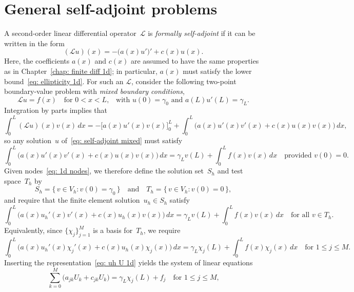 \section{General self-adjoint problems}
A second-order linear differential operator~$\mathcal{L}$ is 
\emph{formally self-adjoint} if it can be written in the form
\begin{equation}\label{eq: L self-adjoint}
(\mathcal{L}u)(x)=-\bigl(a(x)u'\bigr)'+c(x)u(x).
\end{equation}
Here, the coefficients $a(x)$ and $c(x)$ are assumed to have the same 
properties as in Chapter~\ref{chap: finite diff 1d}; in particular, $a(x)$ must 
satisfy the lower bound~\eqref{eq: ellipticity 1d}. For such an $\mathcal{L}$, 
consider the following two-point boundary-value problem with \emph{mixed 
boundary conditions},
\begin{equation}\label{eq: self-adjoint mixed}
\mathcal{L}u=f(x)\quad\text{for $0<x<L$,}\quad
\text{with $u(0)=\gamma_0$ and $a(L)u'(L)=\gamma_L$.}
\end{equation}
Integration by parts implies that
\begin{equation}\label{eq: Lu v by parts}
\int_0^L(\mathcal{L}u)(x)v(x)\,dx
    =-\bigl[a(x)u'(x)v(x)\bigr]_0^L+\int_0^L\bigl(a(x)u'(x)v'(x)+c(x)u(x)v(x)
        \bigr)\,dx,
\end{equation}
so any solution~$u$ of~\eqref{eq: self-adjoint mixed} must satisfy
\begin{equation}\label{eq: Lu=f weak 1d}
\int_0^L\bigl(a(x)u'(x)v'(x)+c(x)u(x)v(x)\bigr)\,dx
    =\gamma_Lv(L)+\int_0^Lf(x)v(x)\,dx
    \quad\text{provided $v(0)=0$.}
\end{equation}
Given nodes~\eqref{eq: 1d nodes}, we therefore define the solution set~$S_h$ and 
test space~$T_h$ by
\[
S_h=\{\,v\in V_h:v(0)=\gamma_0\,\}
\quad\text{and}\quad
T_h=\{\,v\in V_h:v(0)=0\,\},
\]
and require that the finite element solution~$u_h\in S_h$ satisfy
\begin{equation}\label{eq: self-adjoint mixed bc FEM}
\int_0^L\bigl(a(x)u_h'(x)v'(x)+c(x)u_h(x)v(x)\bigr)\,dx
    =\gamma_Lv(L)+\int_0^Lf(x)v(x)\,dx
    \quad\text{for all $v\in T_h$.}
\end{equation}
Equivalently, since $\{\chi_j\}_{j=1}^M$ is a basis for~$T_h$, we require
\[
\int_0^L\bigl(a(x)u_h'(x)\chi_j'(x)+c(x)u_h(x)\chi_j(x)\bigr)\,dx
    =\gamma_L\chi_j(L)+\int_0^Lf(x)\chi_j(x)\,dx
    \quad\text{for $1\le j\le M$.}
\]
Inserting the representation~\eqref{eq: uh U 1d} yields the system of linear 
equations
\[
\sum_{k=0}^M\bigl(a_{jk}U_k+c_{jk}U_k\bigr)=\gamma_L\chi_j(L)+f_j
    \quad\text{for $1\le j\le M$,}
\]
